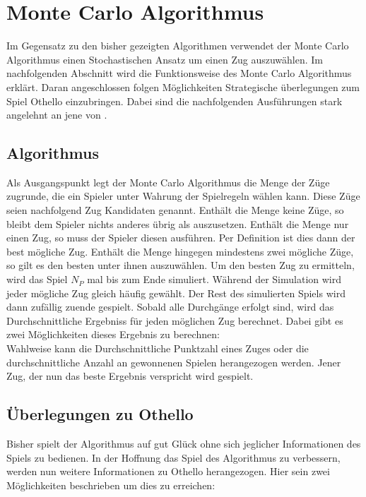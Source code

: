 \section{Monte Carlo Algorithmus}
Im Gegensatz zu den bisher gezeigten Algorithmen verwendet der Monte Carlo Algorithmus einen Stochastischen Ansatz um einen Zug auszuwählen. Im nachfolgenden Abschnitt wird die Funktionsweise des Monte Carlo Algorithmus erklärt. Daran angeschlossen folgen Möglichkeiten Strategische überlegungen zum Spiel Othello einzubringen. Dabei sind die nachfolgenden Ausführungen stark angelehnt an jene von \cite{nijssen_2007}.
\subsection{Algorithmus}
Als Ausgangspunkt legt der Monte Carlo Algorithmus die Menge der Züge zugrunde, die ein Spieler unter Wahrung der Spielregeln wählen kann. Diese Züge seien nachfolgend Zug Kandidaten genannt. Enthält die Menge keine Züge, so bleibt dem Spieler nichts anderes übrig als auszusetzen. Enthält die Menge nur einen Zug, so muss der Spieler diesen ausführen. Per Definition ist dies dann der best mögliche Zug. Enthält die Menge hingegen mindestens zwei mögliche Züge, so gilt es den besten unter ihnen auszuwählen. Um den besten Zug zu ermitteln, wird das Spiel $N_{P}$ mal bis zum Ende simuliert. Während der Simulation wird jeder mögliche Zug gleich häufig gewählt. Der Rest des simulierten Spiels wird dann zufällig zuende gespielt. Sobald alle Durchgänge erfolgt sind, wird das Durchschnittliche Ergebniss für jeden möglichen Zug berechnet. Dabei gibt es zwei Möglichkeiten dieses Ergebnis zu berechnen:\\
Wahlweise kann die Durchschnittliche Punktzahl eines Zuges oder die durchschnittliche Anzahl an gewonnenen Spielen herangezogen werden. Jener Zug, der nun das beste Ergebnis verspricht wird gespielt.
\subsection{Überlegungen zu Othello}
Bisher spielt der Algorithmus auf gut Glück ohne sich jeglicher Informationen des Spiels zu bedienen. In der Hoffnung das Spiel des Algorithmus zu verbessern, werden nun weitere Informationen zu Othello herangezogen. Hier sein zwei Möglichkeiten beschrieben um dies zu erreichen:
